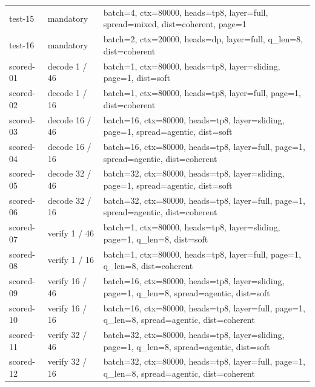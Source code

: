 \documentclass[11pt,letterpaper]{article}
\begin{document}
\begin{longtable}{@{}p{.13\linewidth}p{.30\linewidth}p{.51\linewidth}@{}}
test-15 & mandatory & batch=4, ctx=80000, heads=tp8, layer=full, spread=mixed, dist=coherent, page=1\\

test-16 & mandatory & batch=2, ctx=20000, heads=dp, layer=full, q\_len=8, dist=coherent\\

scored-01 & decode 1 / 46 & batch=1, ctx=80000, heads=tp8, layer=sliding, page=1, dist=soft\\

scored-02 & decode 1 / 16 & batch=1, ctx=80000, heads=tp8, layer=full, page=1, dist=coherent\\

scored-03 & decode 16 / 46 & batch=16, ctx=80000, heads=tp8, layer=sliding, page=1, spread=agentic, dist=soft\\

scored-04 & decode 16 / 16 & batch=16, ctx=80000, heads=tp8, layer=full, page=1, spread=agentic, dist=coherent\\

scored-05 & decode 32 / 46 & batch=32, ctx=80000, heads=tp8, layer=sliding, page=1, spread=agentic, dist=soft\\

scored-06 & decode 32 / 16 & batch=32, ctx=80000, heads=tp8, layer=full, page=1, spread=agentic, dist=coherent\\

scored-07 & verify 1 / 46 & batch=1, ctx=80000, heads=tp8, layer=sliding, page=1, q\_len=8, dist=soft\\

scored-08 & verify 1 / 16 & batch=1, ctx=80000, heads=tp8, layer=full, page=1, q\_len=8, dist=coherent\\

scored-09 & verify 16 / 46 & batch=16, ctx=80000, heads=tp8, layer=sliding, page=1, q\_len=8, spread=agentic, dist=soft\\

scored-10 & verify 16 / 16 & batch=16, ctx=80000, heads=tp8, layer=full, page=1, q\_len=8, spread=agentic, dist=coherent\\

scored-11 & verify 32 / 46 & batch=32, ctx=80000, heads=tp8, layer=sliding, page=1, q\_len=8, spread=agentic, dist=soft\\

scored-12 & verify 32 / 16 & batch=32, ctx=80000, heads=tp8, layer=full, page=1, q\_len=8, spread=agentic, dist=coherent\\

\bottomrule\end{longtable}\normalsize
\end{document}
